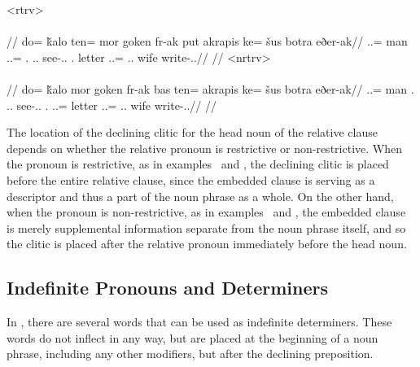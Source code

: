 	\a<rtrv>\begingl
		\glpreamble{}\\
		\\
		//
		\gla do= ǩalo ten= mor goken fr-ak put akrapis ke= šus botra eðer-ak//
		\glb \An.\Sg.\Erg= man \In.\Pl.\Acc= \Fps.\Abs{} \In.\Pl.\Dat{} see-\Ind.\Pst.\Pfv{} \Rel.\Rtrv{} letter \An.\Sg.\Dat= \Tps.\An.\Gen{} wife write-\Ind.\Pst.\Pfv//
		\glft{}//
	\endgl
	\a<nrtrv>\begingl
		\glpreamble{}\\
		\\
		//
		\gla do= ǩalo mor goken fr-ak bas ten= akrapis ke= šus botra eðer-ak//
		\glb \An.\Sg.\Erg= man \Fps.\Abs{} \In.\Pl.\Dat{} see-\Ind.\Pst.\Pfv{} \Rel.\Nrtrv{} \In.\Pl.\Acc= letter \An.\Sg.\Dat= \Tps.\An.\Gen{} wife write-\Ind.\Pst.\Pfv//
		\glft{}//
	\endgl
\xe

The location of the declining clitic for the head noun of the relative clause depends on whether the relative pronoun is restrictive or non-restrictive. When the pronoun is restrictive, as in examples~ and , the declining clitic is placed before the entire relative clause, since the embedded clause is serving as a descriptor and thus a part of the noun phrase as a whole. On the other hand, when the pronoun is non-restrictive, as in examples~ and , the embedded clause is merely supplemental information separate from the noun phrase itself, and so the clitic is placed after the relative pronoun immediately before the head noun.

\subsection{Indefinite Pronouns and Determiners}
\label{subsec:tvk-indefinite-pronouns-determiners}

In \langtvk, there are several words that can be used as indefinite determiners. These words do not inflect in any way, but are placed at the beginning of a noun phrase, including any other modifiers, but after the declining preposition.

